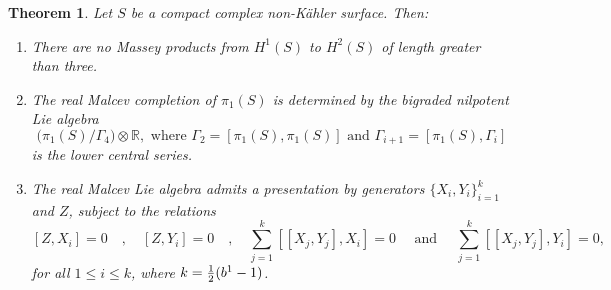 \documentclass[a4paper]{amsart}
\newtheorem{theo}{Theorem}[section]
\theoremstyle{definition}
\begin{document}
\begin{theo}
Let \(S\) be a compact complex non-Kähler surface. Then:
\begin{enumerate}
    \item There are no Massey products from \(H^1(S)\) to \(H^2(S)\) of length greater than three.
    \item The real Malcev completion of \(\pi_1(S)\) is determined by the bigraded nilpotent Lie algebra
    \[\bigl(\pi_1(S)/\Gamma_4 \bigr) \otimes \mathbb{R},\text{ where } \Gamma_2 = [\pi_1(S), \pi_1(S)]\text{ and }\Gamma_{i+1} = [\pi_1(S), \Gamma_i]\] is the lower central series.
    \item
    The real Malcev Lie algebra
    admits a presentation by generators $\{X_i,Y_i\}_{i=1}^k$ and $Z$, subject to the relations
 \[[Z,X_i]=0\quad,\quad[Z,Y_i]=0\quad,\quad \sum_{j=1}^k [[X_j,Y_j],X_i]=0\quad\text{ and }\quad\sum_{j=1}^k [[X_j,Y_j],Y_i]=0,\]
 for all $1\leq i\leq k$, where $k={1\over 2}(b^1-1)$.
\end{enumerate}
\end{theo}
\end{document}
